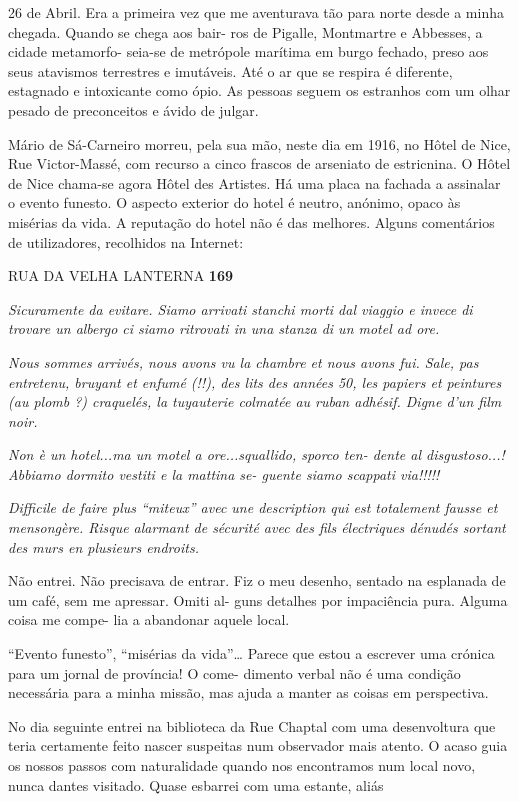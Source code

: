 26 de Abril. Era a primeira vez que me aventurava tão para norte desde a
minha chegada. Quando se chega aos bair- ros de Pigalle, Montmartre e
Abbesses, a cidade metamorfo- seia-se de metrópole marítima em burgo
fechado, preso aos seus atavismos terrestres e imutáveis. Até o ar que
se respira é diferente, estagnado e intoxicante como ópio. As pessoas
seguem os estranhos com um olhar pesado de preconceitos e ávido de
julgar.

Mário de Sá-Carneiro morreu, pela sua mão, neste dia em 1916, no Hôtel
de Nice, Rue Victor-Massé, com recurso a cinco frascos de arseniato de
estricnina. O Hôtel de Nice chama-se agora Hôtel des Artistes. Há uma
placa na fachada a assinalar o evento funesto. O aspecto exterior do
hotel é neutro, anónimo, opaco às misérias da vida. A reputação do hotel
não é das melhores. Alguns comentários de utilizadores, recolhidos na
Internet:

RUA DA VELHA LANTERNA \textbf{169}

\emph{Sicuramente da evitare. Siamo arrivati stanchi morti dal viaggio e
invece di trovare un albergo ci siamo ritrovati in una stanza di un
motel ad ore.}

\emph{Nous sommes arrivés, nous avons vu la chambre et nous avons fui.
Sale, pas entretenu, bruyant et enfumé (!!), des lits des années 50, les
papiers et peintures (au plomb ?) craquelés, la tuyauterie colmatée au
ruban adhésif. Digne d'un film noir.}

\emph{Non è un hotel...ma un motel a ore...squallido, sporco ten- dente
al disgustoso...! Abbiamo dormito vestiti e la mattina se- guente siamo
scappati via!!!!!}

\emph{Difficile de faire plus ``miteux'' avec une description qui est
totalement fausse et mensongère. Risque alarmant de sécurité avec des
fils électriques dénudés sortant des murs en plusieurs endroits.}

Não entrei. Não precisava de entrar. Fiz o meu desenho, sentado na
esplanada de um café, sem me apressar. Omiti al- guns detalhes por
impaciência pura. Alguma coisa me compe- lia a abandonar aquele local.

``Evento funesto'', ``misérias da vida''\ldots{} Parece que estou a
escrever uma crónica para um jornal de província! O come- dimento verbal
não é uma condição necessária para a minha missão, mas ajuda a manter as
coisas em perspectiva.

No dia seguinte entrei na biblioteca da Rue Chaptal com uma desenvoltura
que teria certamente feito nascer suspeitas num observador mais atento.
O acaso guia os nossos passos com naturalidade quando nos encontramos
num local novo, nunca dantes visitado. Quase esbarrei com uma estante,
aliás

